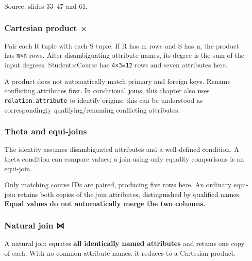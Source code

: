 Source: slides 33--47 and 61.

\subsubsection{Cartesian product ×}\label{05_relational_algebra_en-cartesian-product}

Pair each R tuple with each S tuple. If R has m rows and S has n, the product has \texttt{m×n} rows. After disambiguating attribute names, its degree is the sum of the input degrees. Student×Course has \texttt{4×3=12} rows and seven attributes here.

A product does not automatically match primary and foreign keys. Rename conflicting attributes first. In conditional joins, this chapter also uses \texttt{relation.\allowbreak{}attribute} to identify origins; this can be understood as correspondingly qualifying/renaming conflicting attributes.

\subsubsection{Theta and equi-joins}\label{05_relational_algebra_en-theta-and-equi-joins}


The identity assumes disambiguated attributes and a well-defined condition. A theta condition can compare values; a join using only equality comparisons is an equi-join.


Only matching course IDs are paired, producing five rows here. An ordinary equi-join retains both copies of the join attributes, distinguished by qualified names. \textbf{Equal values do not automatically merge the two columns.}

\subsubsection{Natural join ⋈}\label{05_relational_algebra_en-natural-join}

A natural join equates \textbf{all identically named attributes} and retains one copy of each. With no common attribute names, it reduces to a Cartesian product.


